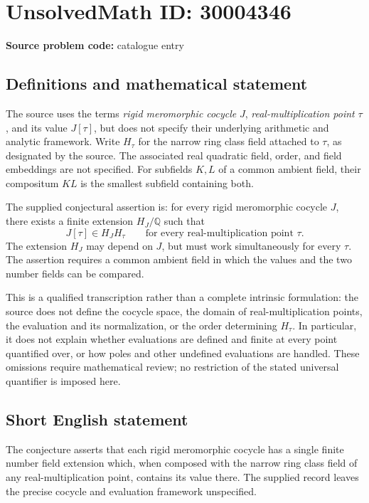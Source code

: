 \documentclass[11pt]{article}
\newcommand{\Q}{\mathbb{Q}}
\begin{document}
\section*{UnsolvedMath ID: 30004346}
\textbf{Source problem code:} catalogue entry
\subsection{Definitions and mathematical statement}
The source uses the terms \emph{rigid meromorphic cocycle} \(J\), \emph{real-multiplication point} \(\tau\), and its value \(J[\tau]\), but does not specify their underlying arithmetic and analytic framework. Write \(H_\tau\) for the narrow ring class field attached to \(\tau\), as designated by the source. The associated real quadratic field, order, and field embeddings are not specified. For subfields \(K,L\) of a common ambient field, their compositum \(KL\) is the smallest subfield containing both.

The supplied conjectural assertion is: for every rigid meromorphic cocycle \(J\), there exists a finite extension \(H_J/\Q\) such that
\[
  J[\tau]\in H_JH_\tau
  \qquad\text{for every real-multiplication point }\tau.
\]
The extension \(H_J\) may depend on \(J\), but must work simultaneously for every \(\tau\). The assertion requires a common ambient field in which the values and the two number fields can be compared.

This is a qualified transcription rather than a complete intrinsic formulation: the source does not define the cocycle space, the domain of real-multiplication points, the evaluation and its normalization, or the order determining \(H_\tau\). In particular, it does not explain whether evaluations are defined and finite at every point quantified over, or how poles and other undefined evaluations are handled. These omissions require mathematical review; no restriction of the stated universal quantifier is imposed here.
\subsection{Short English statement}
The conjecture asserts that each rigid meromorphic cocycle has a single finite number field extension which, when composed with the narrow ring class field of any real-multiplication point, contains its value there. The supplied record leaves the precise cocycle and evaluation framework unspecified.
\end{document}
